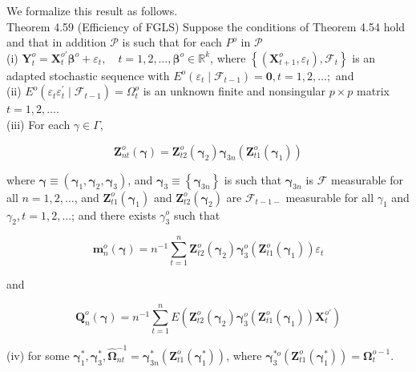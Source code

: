 \documentclass[10pt]{article}
\begin{document}
We formalize this result as follows.\\
Theorem 4.59 (Efficiency of FGLS) Suppose the conditions of Theorem 4.54 hold and that in addition $\mathcal{P}$ is such that for each $P^{o}$ in $\mathcal{P}$\\
(i) $\mathbf{Y}_{t}^{o}=\mathbf{X}_{t}^{o \prime} \boldsymbol{\beta}^{o}+\varepsilon_{t}, \quad t=1,2, \ldots, \boldsymbol{\beta}^{o} \in \mathbb{R}^{k}$, where $\left\{\left(\mathbf{X}_{t+1}^{o}, \varepsilon_{t}\right), \mathcal{F}_{t}\right\}$ is an adapted stochastic sequence with $E^{o}\left(\varepsilon_{t} \mid\right. \left.\mathcal{F}_{t-1}\right)=\mathbf{0}, t=1,2, \ldots ;$ and\\
(ii) $E^{o}\left(\varepsilon_{t} \varepsilon_{t}^{\prime} \mid \mathcal{F}_{t-1}\right)=\Omega_{t}^{o}$ is an unknown finite and nonsingular $p \times p$ matrix $t=1,2, \ldots$.\\
(iii) For each $\gamma \in \Gamma$,

$$
\mathbf{Z}_{n t}^{o}(\boldsymbol{\gamma})=\mathbf{Z}_{t 2}^{o}\left(\boldsymbol{\gamma}_{2}\right) \boldsymbol{\gamma}_{3 n}\left(\mathbf{Z}_{t 1}^{o}\left(\boldsymbol{\gamma}_{1}\right)\right)
$$

where $\boldsymbol{\gamma} \equiv\left(\boldsymbol{\gamma}_{1}, \boldsymbol{\gamma}_{2}, \boldsymbol{\gamma}_{3}\right)$, and $\boldsymbol{\gamma}_{3} \equiv\left\{\boldsymbol{\gamma}_{3 n}\right\}$ is such that $\boldsymbol{\gamma}_{3 n}$ is $\mathcal{F}$ measurable for all $n=1,2, \ldots$, and $\mathbf{Z}_{t 1}^{o}\left(\boldsymbol{\gamma}_{1}\right)$ and $\mathbf{Z}_{t 2}^{o}\left(\boldsymbol{\gamma}_{2}\right)$ are $\mathcal{F}_{t-1-}$ measurable for all $\gamma_{1}$ and $\gamma_{2}, t=1,2, \ldots$; and there exists $\gamma_{3}^{o}$ such that

$$
\mathbf{m}_{n}^{o}(\boldsymbol{\gamma})=n^{-1} \sum_{t=1}^{n} \mathbf{Z}_{t 2}^{o}\left(\boldsymbol{\gamma}_{2}\right) \boldsymbol{\gamma}_{3}^{o}\left(\mathbf{Z}_{t 1}^{o}\left(\boldsymbol{\gamma}_{1}\right)\right) \varepsilon_{t}
$$

and

$$
\mathbf{Q}_{n}^{o}(\boldsymbol{\gamma})=n^{-1} \sum_{t=1}^{n} E\left(\mathbf{Z}_{t 2}^{o}\left(\boldsymbol{\gamma}_{2}\right) \boldsymbol{\gamma}_{3}^{o}\left(\mathbf{Z}_{t 1}^{o}\left(\boldsymbol{\gamma}_{1}\right)\right) \mathbf{X}_{t}^{o \prime}\right)
$$

(iv) for some $\boldsymbol{\gamma}_{1}^{*}, \boldsymbol{\gamma}_{3}^{*}, \hat{\boldsymbol{\Omega}}_{n t}^{-1}=\boldsymbol{\gamma}_{3 n}^{*}\left(\mathbf{Z}_{t 1}^{o}\left(\boldsymbol{\gamma}_{1}^{*}\right)\right)$, where $\boldsymbol{\gamma}_{3}^{* o}\left(\mathbf{Z}_{t 1}^{o}\left(\boldsymbol{\gamma}_{1}^{*}\right)\right)=\boldsymbol{\Omega}_{t}^{o-1}$.
\end{document}
